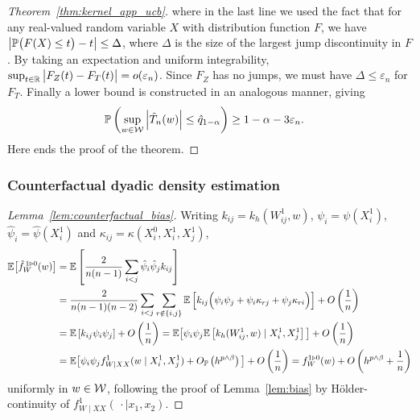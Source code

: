 \begin{proof}[Theorem~\ref{thm:kernel_app_ucb}]
  where in the last line we used the fact that for any
  real-valued random variable $X$ with distribution function $F$,
  we have
  $\big|\P\big(F(X) \leq t\big) - t\big| \leq \Delta$,
  where $\Delta$ is the size of the
  largest jump discontinuity in $F$.
  By taking an expectation and uniform integrability,
  $\sup_{t \in \R} \big| F_Z(t) - F_T(t) \big| = o(\varepsilon_n)$.
  Since $F_Z$ has no jumps,
  we must have $\Delta \leq \varepsilon_n$ for $F_T$.
  Finally a lower bound is constructed in an analogous manner,
  giving
  \begin{align*}
    \P\left(
      \sup_{w \in \cW}
      \left| \hat T_n(w) \right|
      \leq
      \hat q_{1-\alpha}
    \right)
    &\geq
    1 - \alpha - 3\varepsilon_n.
  \end{align*}
  Here ends the proof of the theorem.
\end{proof}

\subsubsection{Counterfactual dyadic density estimation}
\begin{proof}[Lemma~\ref{lem:counterfactual_bias}]

  Writing
  $k_{ij} = k_h(W_{ij}^1, w)$,
  $\psi_i = \psi(X_i^1)$,
  $\hat\psi_i = \hat\psi(X_i^1)$
  and $\kappa_{ij} = \kappa(X_i^0, X_i^1, X_j^1)$,
  \begin{align*}
    \E\big[\hat f_W^{\,1 \triangleright 0}(w)\big]
    &=
    \E\left[
      \frac{2}{n(n-1)}
      \sum_{i<j}
      \hat \psi_i
      \hat \psi_j
      k_{ij}
    \right] \\
    &=
    \frac{2}{n(n-1)(n-2)}
    \sum_{i < j}
    \sum_{r \notin \{i,j\}}
    \E\left[
      k_{ij}
      \Big(
      \psi_i
      \psi_j
      +\psi_i
      \kappa_{r j}
      +\psi_j
      \kappa_{r i}
      \Big)
    \right]
    + O\left(\frac{1}{n}\right) \\
    &=
    \E\left[
      k_{ij}
      \psi_i
      \psi_j
    \right]
    + O\left(\frac{1}{n}\right)
    =
    \E\big[
      \psi_i
      \psi_j
      \E\left[
        k_h(W_{ij}^1, w)
        \mid X_i^1, X_j^1
      \right]
      \big]
    + O\left(\frac{1}{n}\right) \\
    &=
    \E\big[
      \psi_i
      \psi_j
      f_{W \mid XX}^1(w \mid X_i^1, X_j^1)
      + O_\P\left( h^{p \wedge \beta} \right)
      \big]
    + O\left(\frac{1}{n}\right)
    =
    f_W^{1 \triangleright 0}(w)
    + O\left( h^{p \wedge \beta} + \frac{1}{n}\right)
  \end{align*}
  uniformly in $w \in \cW$, following the proof of
  Lemma~\ref{lem:bias} by H{\"o}lder-continuity
  of $f_{W \mid XX}^1(\,\cdot \mid x_1, x_2)$.
\end{proof}

